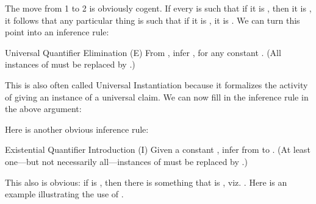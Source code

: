 \begin{argument}

 \aitem {}
 \aitem {}
 \aitem {}
 \aitem {}

\end{argument}

The move from 1 to 2 is obviously cogent. If every  is such that if it is 
, then it is , it follows that any particular thing  is such that 
if it is , it is . We can turn this point into an inference rule:

\begin{infrule}

 \item[Universal Quantifier Elimination (\p{\lforall}E)] From \p{\seq{\Lambda}
  {\lforall\upsilon\phi(\upsilon)}}, infer \p{\seq{\Lambda}{\phi(\kappa)}}, for 
  any constant \p{\kappa}. (All instances of \p{\upsilon} must be replaced by 
  \p{\kappa}.)

\end{infrule}

This is also often called Universal Instantiation because it formalizes the 
activity of giving an instance of a universal claim.  We can now fill in the 
inference rule in the above argument:

\begin{argumentN}[1]

 \aitem {}
 \aitem {}
 \aitem {}
 \aitem {}

\end{argumentN}

Here is another obvious inference rule:


\begin{infrule}

 \item[Existential Quantifier Introduction (\p{\lthereis}I)] Given a constant 
  \p{\kappa}, infer from \p{\seq{\Lambda}
 {\phi(\kappa)}} to \p{\seq{\Lambda}\lthereis\upsilon\phi(\upsilon)}. (At least 
 one---but not necessarily all---instances of \p{\kappa} must be replaced by 
 \p{\upsilon}.)

\end{infrule}

This also is obvious: if \p{\kappa} is \p{\phi}, then there is something that is 
\p{\phi}, viz. \p{\kappa}. Here is an example illustrating the use of \exI.  

